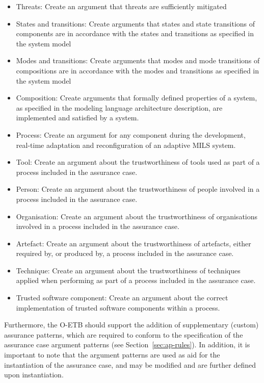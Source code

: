 \documentclass[12pt,twoside,a4paper]{article}
\begin{document}
\begin{itemize}
\item Threats: Create an argument that threats are sufficiently mitigated
\item States and transitions: Create arguments that states and state transitions of components are in accordance with the states and transitions as specified in the system model
\item Modes and transitions: Create arguments that modes and mode transitions of compositions are in accordance with the modes and transitions as specified in the system model
\item Composition: Create arguments that formally defined properties of a system, as specified in the modeling language architecture description, are implemented and satisfied by a system.
\item Process: Create an argument for any component during the development, real-time adaptation and reconfiguration of an adaptive MILS system.
\item Tool: Create an argument about the trustworthiness of tools used as part of a process included in the assurance case. 
\item Person: Create an argument about the trustworthiness of people involved in a process included in the assurance case. 
\item Organisation: Create an argument about the trustworthiness of organisations involved in a process included in the assurance case.
\item Artefact: Create an argument about the trustworthiness of artefacts, either required by, or produced by, a process included in the assurance case.
\item Technique: Create an argument about the trustworthiness of techniques applied when performing as part of a process included in the assurance case.
\item Trusted software component: Create an argument about the correct implementation of trusted software components within a process.  
\end{itemize}

Furthermore, the O-ETB should support the addition of supplementary (custom) assurance patterns, which are required to conform to the specification of the assurance case argument patterns (see Section~\ref{sec:ap-rules}). In addition, it is important to note that the argument patterns are used as aid for the instantiation of the assurance case, and may be modified and are further defined upon instantiation. 

\end{document}

